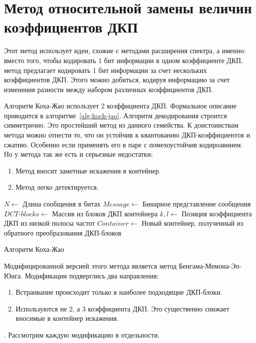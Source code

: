 \section{Метод относительной замены величин коэффициентов ДКП}
Этот метод использует идеи, схожие с методами расширения спектра, а именно:
вместо того, чтобы кодировать 1 бит информации в одном коэффициенте ДКП,
метод предлагает кодировать 1 бит информации за счет нескольких коэффициентов ДКП.
Этого можно добиться, кодируя информацию за счет изменения разности между
набором различных коэффициентов ДКП.

Алгоритм Коха-Жао использует 2 коэффициента ДКП.
Формальное описание приводится в алгоритме~\ref{alg:koch-jao}.
Алгоритм декодирования строится симметрично.
Это простейший метод из данного семейства. К доистоинствам
метода можно отнести то, что он устойчив к квантованию ДКП-коэффициентов
и сжатию. Особенно если применять его в паре с помехоустойчив кодироавнием.
Но у метода так же есть и серьезные недостатки:
\begin{enumerate}
    \item Метод вносит заметные искажения в контейнер.
    \item Метод легко детектируется.
\end{enumerate}

\begin{algorithm}[ht!]
     $N \leftarrow$ Длина сообщения в битах\;
     $Message \leftarrow$ Бинарное представление сообщения\;
     $DCT$-$blocks \leftarrow$ Массив из блоков ДКП контейнера\;
     $k, l \leftarrow$ Позиция коэффициента ДКП из низкой полосы частот\;
     $Container \leftarrow$ Новый контейнер, полученный из обратного преобразования ДКП-блоков\;
     \caption{Алгоритм Коха-Жао}
    \label{alg:koch-jao}
\end{algorithm}

Модифицированной версией этого метода является метод Бенгама-Мемона-Эо-Юнга.
Модификации подверглись два направления:
\begin{enumerate}
    \item Встраивание происходит только в наиболее подходящие ДКП-блоки.
    \item Используются не 2, а 3 коэффициента ДКП. Это существенно снижает
    вносимые в контейнер искажения.
\end{enumerate}.
Рассмотрим каждую модификацию в отдельности.

